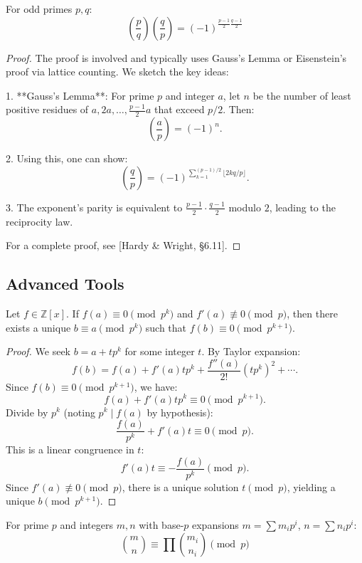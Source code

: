 \documentclass{scrartcl} %
\begin{document}
\begin{theorem}\label{thm:quadraticreciprocity}
For odd primes $p,q$:
\[ \left(\frac{p}{q}\right)\left(\frac{q}{p}\right) = (-1)^{\frac{p-1}{2}\frac{q-1}{2}} \]
\end{theorem}

\begin{proof}
The proof is involved and typically uses Gauss's Lemma or Eisenstein's proof via lattice counting. We sketch the key ideas:

1. **Gauss's Lemma**: For prime $p$ and integer $a$, let $n$ be the number of least positive residues of $a, 2a, \ldots, \frac{p-1}{2}a$ that exceed $p/2$. Then:
\[
\left(\frac{a}{p}\right) = (-1)^n.
\]

2. Using this, one can show:
\[
\left(\frac{q}{p}\right) = (-1)^{\sum_{k=1}^{(p-1)/2} \lfloor 2kq/p \rfloor}.
\]

3. The exponent's parity is equivalent to $\frac{p-1}{2} \cdot \frac{q-1}{2}$ modulo $2$, leading to the reciprocity law.

For a complete proof, see [Hardy \& Wright, §6.11].
\end{proof}

\subsection{Advanced Tools}

\begin{theorem}\label{thm:henselslemma}
Let $f \in \mathbb{Z}[x]$. If $f(a) \equiv 0 \pmod{p^k}$ and $f'(a) \not\equiv 0 \pmod{p}$, then there exists a unique $b \equiv a \pmod{p^k}$ such that $f(b) \equiv 0 \pmod{p^{k+1}}$.
\end{theorem}

\begin{proof}
We seek $b = a + t p^k$ for some integer $t$. By Taylor expansion:
\[
f(b) = f(a) + f'(a) t p^k + \frac{f''(a)}{2!} (t p^k)^2 + \cdots.
\]
Since $f(b) \equiv 0 \pmod{p^{k+1}}$, we have:
\[
f(a) + f'(a) t p^k \equiv 0 \pmod{p^{k+1}}.
\]
Divide by $p^k$ (noting $p^k \mid f(a)$ by hypothesis):
\[
\frac{f(a)}{p^k} + f'(a) t \equiv 0 \pmod{p}.
\]
This is a linear congruence in $t$:
\[
f'(a) t \equiv -\frac{f(a)}{p^k} \pmod{p}.
\]
Since $f'(a) \not\equiv 0 \pmod{p}$, there is a unique solution $t \pmod{p}$, yielding a unique $b \pmod{p^{k+1}}$.
\end{proof}

\begin{theorem}\label{thm:lucastheorem}
For prime $p$ and integers $m,n$ with base-$p$ expansions $m = \sum m_i p^i$, $n = \sum n_i p^i$:
\[ \binom{m}{n} \equiv \prod \binom{m_i}{n_i} \pmod{p} \]
\end{theorem}
\end{document}
